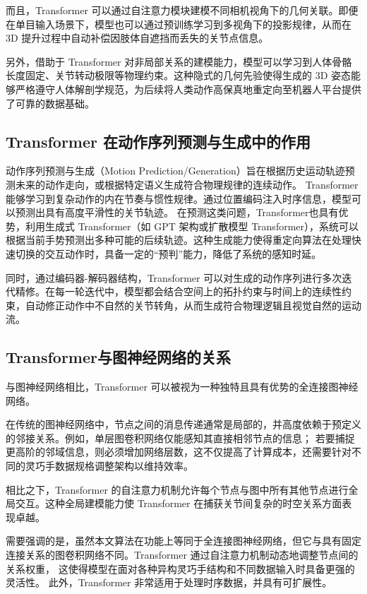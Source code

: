 而且，Transformer 可以通过自注意力模块建模不同相机视角下的几何关联。即便在单目输入场景下，模型也可以通过预训练学习到多视角下的投影规律，从而在 3D 提升过程中自动补偿因肢体自遮挡而丢失的关节点信息。

另外，借助于 Transformer 对非局部关系的建模能力，模型可以学习到人体骨骼长度固定、关节转动极限等物理约束。这种隐式的几何先验使得生成的 3D 姿态能够严格遵守人体解剖学规范，为后续将人类动作高保真地重定向至机器人平台提供了可靠的数据基础。
\subsection{Transformer 在动作序列预测与生成中的作用}
动作序列预测与生成（Motion Prediction/Generation）旨在根据历史运动轨迹预测未来的动作走向，或根据特定语义生成符合物理规律的连续动作。
Transformer 能够学习到复杂动作的内在节奏与惯性规律。通过位置编码注入时序信息，模型可以预测出具有高度平滑性的关节轨迹。
在预测这类问题，Transformer也具有优势，利用生成式 Transformer（如 GPT 架构或扩散模型 Transformer），系统可以根据当前手势预测出多种可能的后续轨迹。这种生成能力使得重定向算法在处理快速切换的交互动作时，具备一定的“预判”能力，降低了系统的感知时延。

同时，通过编码器-解码器结构，Transformer 可以对生成的动作序列进行多次迭代精修。在每一轮迭代中，模型都会结合空间上的拓扑约束与时间上的连续性约束，自动修正动作中不自然的关节转角，从而生成符合物理逻辑且视觉自然的运动流。

\subsection{Transformer与图神经网络的关系}
与图神经网络相比，Transformer 可以被视为一种独特且具有优势的全连接图神经网络\cite{joshiTransformersAreGraph2025}。

在传统的图神经网络中，节点之间的消息传递通常是局部的，并高度依赖于预定义的邻接关系\cite{feyFastGraphRepresentation2019}。例如，单层图卷积网络仅能感知其直接相邻节点的信息；
若要捕捉更高阶的邻域信息，则必须增加网络层数，这不仅提高了计算成本，还需要针对不同的灵巧手数据规格调整架构以维持效率。

相比之下，Transformer 的自注意力机制允许每个节点与图中所有其他节点进行全局交互。这种全局建模能力使 Transformer 在捕获关节间复杂的时空关系方面表现卓越\cite{rampasekRecipeGeneralPowerful2022}。

需要强调的是，虽然本文算法在功能上等同于全连接图神经网络，但它与具有固定连接关系的图卷积网络不同。Transformer 通过自注意力机制动态地调整节点间的关系权重，
这使得模型在面对各种异构灵巧手结构和不同数据输入时具备更强的灵活性。
此外，Transformer 非常适用于处理时序数据，并具有可扩展性。
